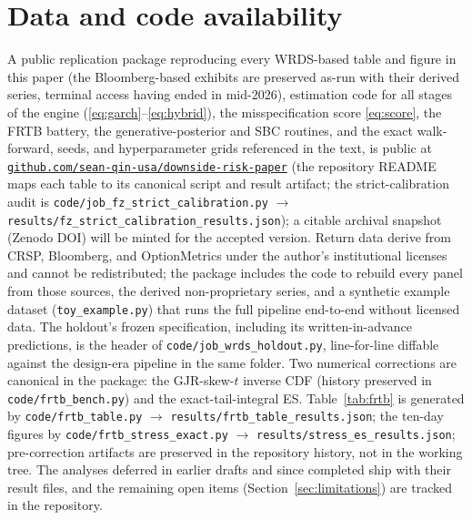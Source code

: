 \documentclass[11pt]{article}
\theoremstyle{remark}
\begin{document}
\section*{Data and code availability}
A public replication package reproducing every WRDS-based table and
figure in this paper (the Bloomberg-based exhibits are preserved
as-run with their derived series, terminal access having ended in
mid-2026), estimation code for all stages of the engine
(\eqref{eq:garch}--\eqref{eq:hybrid}), the misspecification score
\eqref{eq:score}, the FRTB battery, the generative-posterior and SBC
routines, and the exact walk-forward, seeds, and hyperparameter grids referenced in the text, is public at
\href{https://github.com/sean-qin-usa/downside-risk-paper}{\texttt{github.com/sean-qin-usa/downside-risk-paper}}
(the repository README maps each table to its canonical script and
result artifact; the strict-calibration audit is
\texttt{code/job\_fz\_strict\_calibration.py}
$\to$ \texttt{results/fz\_strict\_calibration\_results.json});
a citable archival snapshot (Zenodo DOI) will be minted for the
accepted version. Return data derive from CRSP,
Bloomberg, and OptionMetrics under the author's institutional licenses
and cannot be redistributed; the package includes the code to rebuild
every panel from those sources, the derived non-proprietary series, and
a synthetic example dataset (\texttt{toy\_example.py}) that runs the full
pipeline end-to-end without licensed data. The holdout's frozen
specification, including its written-in-advance predictions, is the
header of \texttt{code/job\_wrds\_holdout.py}, line-for-line diffable
against the design-era pipeline in the same folder. Two numerical corrections are canonical in the package:
the GJR-skew-$t$ inverse CDF (history preserved in
\texttt{code/frtb\_bench.py}) and the exact-tail-integral ES.
Table~\ref{tab:frtb} is generated by \texttt{code/frtb\_table.py}
$\to$ \texttt{results/frtb\_table\_results.json}; the ten-day
figures by \texttt{code/frtb\_stress\_exact.py} $\to$
\texttt{results/stress\_es\_results.json}; pre-correction artifacts
are preserved in the repository history, not in the working tree. The
analyses deferred in earlier drafts and since completed ship with
their result files, and the remaining open items
(Section~\ref{sec:limitations}) are tracked in the repository.




\appendix
\end{document}
